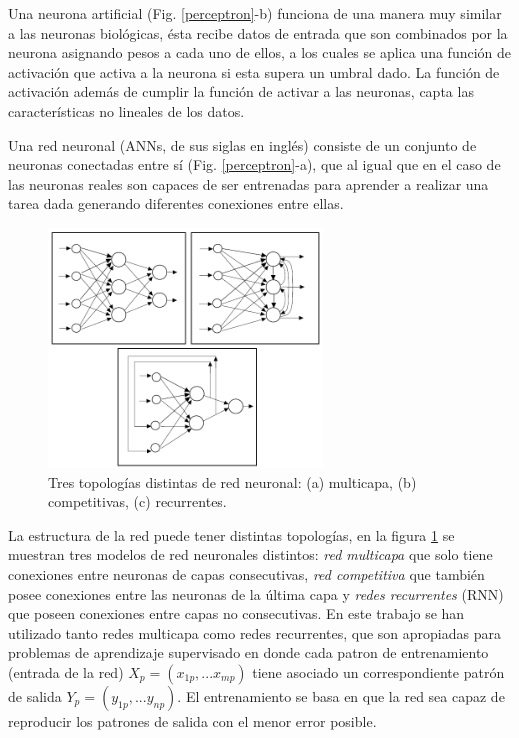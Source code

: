 Una neurona artificial (Fig. \ref{perceptron}-b) funciona de una manera muy similar a las neuronas biológicas, 
ésta recibe datos de entrada que son combinados por la neurona asignando pesos a cada uno de ellos, a los 
cuales se aplica una función de activación que activa a la neurona si esta supera un umbral 
dado. La función de activación además de cumplir la función de activar a las neuronas, capta las 
características no lineales de los datos. 

Una red neuronal (ANNs, de sus siglas en inglés) consiste de un conjunto de neuronas conectadas entre sí 
(Fig. \ref{perceptron}-a), que al igual que en el caso de las neuronas reales son capaces de ser entrenadas para aprender 
a realizar una tarea dada generando diferentes conexiones entre ellas. 

\begin{figure}[h!]
    \begin{center}
      \includegraphics[height=2.5in]{Figures/topologias.PNG}
      \caption{ Tres topologías distintas de red neuronal: (a) multicapa, (b) competitivas, (c) recurrentes. }
      \label{topologias}
    \end{center}
  \end{figure}

La estructura de la red puede tener distintas topologías, en la figura \ref{topologias} se muestran tres modelos de red neuronales 
distintos: \textit{red multicapa} que solo tiene conexiones entre neuronas de capas consecutivas, 
\textit{red competitiva} que también posee conexiones entre las neuronas de la última capa y \textit{redes recurrentes} (RNN) que poseen conexiones entre 
capas no consecutivas. En este trabajo se han utilizado tanto redes multicapa como redes recurrentes, que son apropiadas para problemas de 
aprendizaje supervisado en donde cada patron de entrenamiento (entrada de la red) $X_p=(x_{1p},...x_{mp})$ tiene asociado un 
correspondiente patrón de salida $Y_p=(y_{1p},...y_{np})$. 
El entrenamiento  se basa en que la red sea capaz de reproducir los patrones de salida con el menor error posible.

